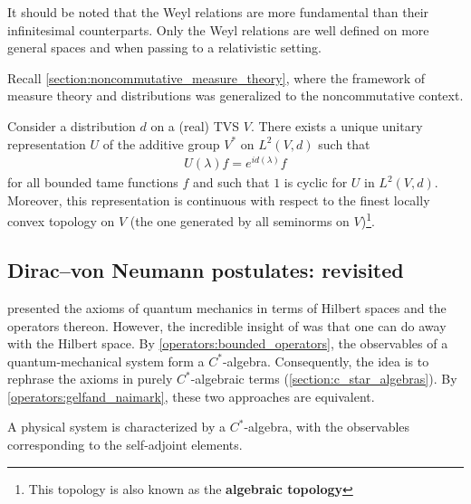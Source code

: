     \begin{remark}
        It should be noted that the Weyl relations are more fundamental than their infinitesimal counterparts. Only the Weyl relations are well defined on more general spaces and when passing to a relativistic setting.
    \end{remark}

    Recall \cref{section:noncommutative_measure_theory}, where the framework of measure theory and distributions was generalized to the noncommutative context.
    \begin{property}
        Consider a distribution $d$ on a (real) TVS $V$. There exists a unique unitary representation $U$ of the additive group $V^*$ on $L^2(V,d)$ such that
        \begin{gather}
            U(\lambda)f = e^{id(\lambda)}f
        \end{gather}
        for all bounded tame functions $f$ and such that $1$ is cyclic for $U$ in $L^2(V,d)$. Moreover, this representation is continuous with respect to the finest locally convex topology on $V$ (the one generated by all seminorms on $V$)\footnote{This topology is also known as the \textbf{algebraic topology}}. 
    \end{property}


\subsection{Dirac--von Neumann postulates: revisited}

     presented the axioms of quantum mechanics in terms of Hilbert spaces and the operators thereon. However, the incredible insight of  was that one can do away with the Hilbert space. By \cref{operators:bounded_operators}, the observables of a quantum-mechanical system form a $C^*$-algebra. Consequently, the idea is to rephrase the axioms in purely $C^*$-algebraic terms (\cref{section:c_star_algebras}). By \cref{operators:gelfand_naimark}, these two approaches are equivalent.

    \begin{axiom}[Observables]
        A physical system is characterized by a $C^*$-algebra, with the observables corresponding to the self-adjoint elements.
    \end{axiom}

